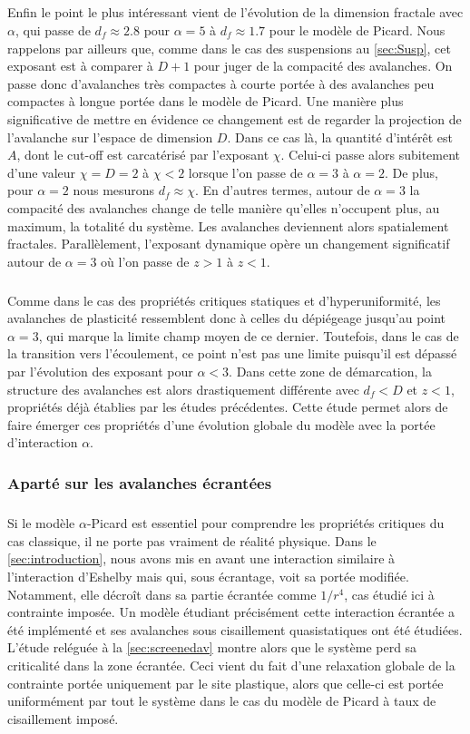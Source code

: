 \subparagraph{}Enfin le point le plus intéressant vient de l'évolution de la dimension fractale avec $\alpha$, qui passe de $d_f\approx 2.8$ pour $\alpha=5$ à $d_f\approx 1.7$ pour le modèle de Picard. Nous rappelons par ailleurs que, comme dans le cas des suspensions au \autoref{sec:Susp}, cet exposant est à comparer à $D+1$ pour juger de la compacité des avalanches. On passe donc d'avalanches très compactes à courte portée à des avalanches peu compactes à longue portée dans le modèle de Picard. Une manière plus significative de mettre en évidence ce changement est de regarder la projection de l'avalanche sur l'espace de dimension $D$. Dans ce cas là, la quantité d'intérêt est $A$, dont le cut-off est carcatérisé par l'exposant $\chi$. Celui-ci passe alors subitement d'une valeur $\chi=D=2$ à $\chi<2$ lorsque l'on passe de $\alpha=3$ à $\alpha=2$. De plus, pour $\alpha=2$ nous mesurons $d_f\approx\chi$. En d'autres termes, autour de $\alpha=3$ la compacité des avalanches change de telle manière qu'elles n'occupent plus, au maximum, la totalité du système. Les avalanches deviennent alors spatialement fractales. Parallèlement, l'exposant dynamique opère un changement significatif autour de $\alpha=3$ où l'on passe de $z>1$ à $z<1$.

\subparagraph{}Comme dans le cas des propriétés critiques statiques et d'hyperuniformité, les avalanches de plasticité ressemblent donc à celles du dépiégeage jusqu'au point $\alpha = 3$, qui marque la limite champ moyen de ce dernier. Toutefois, dans le cas de la transition vers l'écoulement, ce point n'est pas une limite puisqu'il est dépassé par l'évolution des exposant pour $\alpha<3$. Dans cette zone de démarcation, la structure des avalanches est alors drastiquement différente avec $d_f<D$ et $z<1$, propriétés déjà établies par les études précédentes. Cette étude permet alors de faire émerger ces propriétés d'une évolution globale du modèle avec la portée d'interaction $\alpha$.

\subsubsection{Aparté sur les avalanches écrantées}

\subparagraph{}Si le modèle $\alpha$-Picard est essentiel pour comprendre les propriétés critiques du cas classique, il ne porte pas vraiment de réalité physique. Dans le \autoref{sec:introduction}, nous avons mis en avant une interaction similaire à l'interaction d'Eshelby mais qui, sous écrantage, voit sa portée modifiée. Notamment, elle décroît dans sa partie écrantée comme $1/r^4$, cas étudié ici à contrainte imposée. Un modèle étudiant précisément cette interaction écrantée a été implémenté et ses avalanches sous cisaillement quasistatiques ont été étudiées. L'étude reléguée à la \autoref{sec:screenedav} montre alors que le système perd sa criticalité dans la zone écrantée. Ceci vient du fait d'une relaxation globale de la contrainte portée uniquement par le site plastique, alors que celle-ci est portée uniformément par tout le système dans le cas du modèle de Picard à taux de cisaillement imposé.

